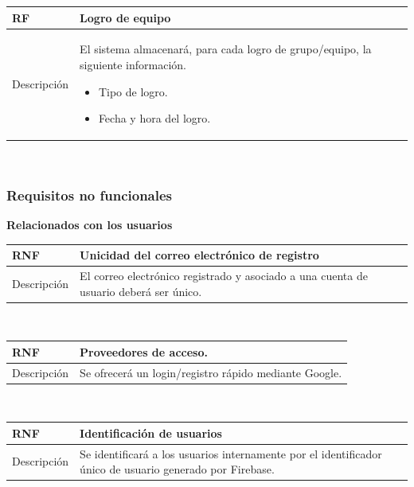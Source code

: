 \documentclass[twoside]{report}
\newcommand\addrow[2]{#1 &#2\\ }
\newcommand\addheading[2]{#1 &#2\\ \hline}
\newcommand\tabularhead{\begin{tabular}{lp{0.7\textwidth}}
\hline
}
\newenvironment{req}{\tabularhead}
{\hline\end{tabular}}
\begin{document}
\vspace{0.25cm}

\begin{req}
	\addheading{\textbf{RF\arabic{functionalRequirements}}}{Logro de equipo}
	\addrow{Descripción}{
	El sistema almacenará, para cada logro de grupo/equipo, la siguiente información.
	\begin{multicols}{2}
	\begin{itemize}
		\item Tipo de logro.
		\item Fecha y hora del logro.
	\end{itemize}
	\end{multicols}
	}
\end{req}\\

\vspace{1cm}

\subsubsection{Requisitos no funcionales}

\textbf{Relacionados con los usuarios}\\

\begin{req}
	\addheading{\textbf{RNF\arabic{nonFunctionalRequirements}}}{Unicidad del correo electrónico de registro}
	\addrow{Descripción}{El correo electrónico registrado y asociado a una cuenta de usuario deberá ser único.}
\end{req}\\

\vspace{0.25cm}

\begin{req}
	\addheading{\textbf{RNF\arabic{nonFunctionalRequirements}}}{Proveedores de acceso.}
	\addrow{Descripción}{Se ofrecerá un login/registro rápido mediante Google.}
\end{req}\\

\vspace{0.25cm}

\begin{req}
	\addheading{\textbf{RNF\arabic{nonFunctionalRequirements}}}{Identificación de usuarios}
	\addrow{Descripción}{Se identificará a los usuarios internamente por el identificador único de usuario generado por Firebase.}
\end{req}\\
\end{document}
